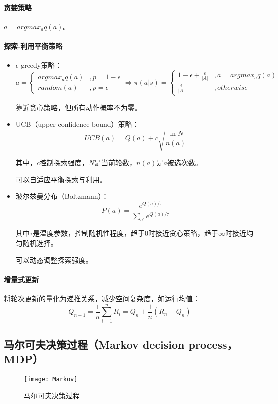 \documentclass[
12pt, %
a4paper, 
oneside, %
headinclude,footinclude, %
]{scrartcl}
\begin{document}
\paragraph{贪婪策略}
$ a = argmax_a q(a) $。
\paragraph{探索-利用平衡策略}
\begin{itemize}
\item $ \epsilon $-greedy策略：
$$
a = 
\begin{cases} 
argmax_a q(a) &, p = 1 - \epsilon \\
random(a) &, p = \epsilon
\end{cases}
\Rightarrow 
\pi(a|s) = 
\begin{cases} 
1 - \epsilon + \frac{\epsilon}{|A|} &, a = argmax_a q(a) \\
\frac{\epsilon}{|A|} &, otherwise
\end{cases}
$$

靠近贪心策略，但所有动作概率不为零。
\item UCB（upper confidence bound）策略：
$$ UCB(a) = Q(a) + c\sqrt{\frac{\ln N}{n(a)}} $$

其中，$ c $控制探索强度，$ N $是当前轮数，$ n(a) $是$ a $被选次数。

可以自适应平衡探索与利用。
\item 玻尔兹曼分布（Boltzmann）：
$$ P(a) = \frac{e^{Q(a)/\tau}}{\sum_{a'} e^{Q(a)/\tau}} $$

其中$ \tau $是温度参数，控制随机性程度，趋于$ 0 $时接近贪心策略，趋于$ \infty $时接近均匀随机选择。

可以动态调整探索强度。
\end{itemize}
\paragraph{增量式更新}
将轮次更新的量化为递推关系，减少空间复杂度，如运行均值：
$$ Q_{n + 1} = \frac{1}{n}\sum_{i = 1}^n R_i = Q_n + \frac{1}{n}(R_n - Q_n) $$
\subsection{马尔可夫决策过程（Markov decision process，MDP）}
\begin{figure}[H]
\centering 
\texttt{[image: Markov]} 
\caption[马尔可夫决策过程]{马尔可夫决策过程}
\end{figure}
\end{document}
